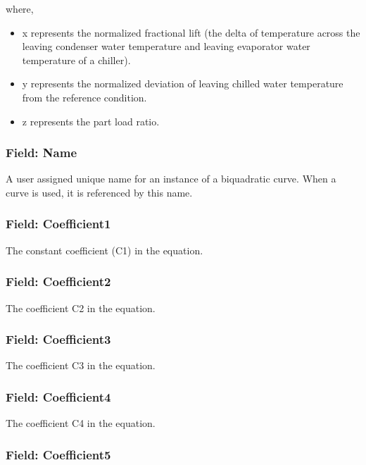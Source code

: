 where,

\begin{itemize}
\tightlist
\item
  x represents the normalized fractional lift (the delta of temperature across the leaving condenser water temperature and leaving evaporator water temperature of a chiller).
\item
  y represents the normalized deviation of leaving chilled water temperature from the reference condition.
\item
  z represents the part load ratio.
\end{itemize}

\subsubsection{Field: Name}\label{field-name-9-011}

A user assigned unique name for an instance of a biquadratic curve. When a curve is used, it is referenced by this name.

\subsubsection{Field: Coefficient1}\label{field-coefficient1}

The constant coefficient (C1) in the equation.

\subsubsection{Field: Coefficient2}\label{field-coefficient2}

The coefficient C2 in the equation.

\subsubsection{Field: Coefficient3}\label{field-coefficient3}

The coefficient C3 in the equation.

\subsubsection{Field: Coefficient4}\label{field-coefficient4}

The coefficient C4 in the equation.

\subsubsection{Field: Coefficient5}\label{field-coefficient5}

